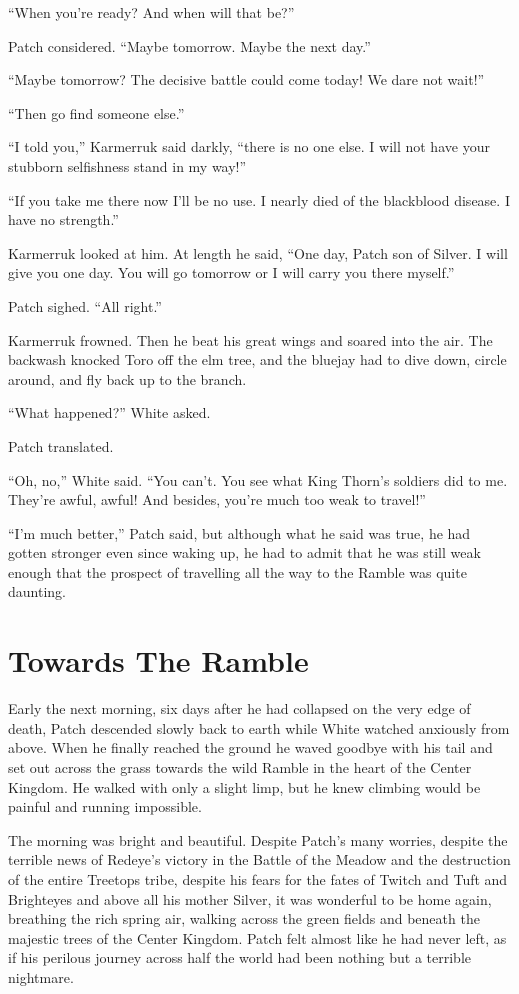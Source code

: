 \documentclass[ebook,oneside,openany,12pt]{memoir}
\begin{document}
“When you’re ready? And when will that be?”

Patch considered. “Maybe tomorrow. Maybe the next day.”

“Maybe tomorrow? The decisive battle could come today! We dare not
wait!”

“Then go find someone else.”

“I told you,” Karmerruk said darkly, “there is no one else. I will not
have your stubborn selfishness stand in my way!”

“If you take me there now I’ll be no use. I nearly died of the
blackblood disease. I have no strength.”

Karmerruk looked at him. At length he said, “One day, Patch son of
Silver. I will give you one day. You will go tomorrow or I will carry
you there myself.”

Patch sighed. “All right.”

Karmerruk frowned. Then he beat his great wings and soared into the
air. The backwash knocked Toro off the elm tree, and the bluejay had
to dive down, circle around, and fly back up to the branch.

“What happened?” White asked.

Patch translated.

“Oh, no,” White said. “You can’t. You see what King Thorn’s soldiers
did to me. They’re awful, awful! And besides, you’re much too weak to
travel!”

“I’m much better,” Patch said, but although what he said was true, he
had gotten stronger even since waking up, he had to admit that he was
still weak enough that the prospect of travelling all the way to the
Ramble was quite daunting.


\section{Towards The Ramble}

Early the next morning, six days after he had collapsed on the very
edge of death, Patch descended slowly back to earth while White
watched anxiously from above. When he finally reached the ground he
waved goodbye with his tail and set out across the grass towards the
wild Ramble in the heart of the Center Kingdom. He walked with only a
slight limp, but he knew climbing would be painful and running
impossible.

The morning was bright and beautiful. Despite Patch’s many worries,
despite the terrible news of Redeye’s victory in the Battle of the
Meadow and the destruction of the entire Treetops tribe, despite his
fears for the fates of Twitch and Tuft and Brighteyes and above all
his mother Silver, it was wonderful to be home again, breathing the
rich spring air, walking across the green fields and beneath the
majestic trees of the Center Kingdom. Patch felt almost like he had
never left, as if his perilous journey across half the world had been
nothing but a terrible nightmare.
\end{document}
